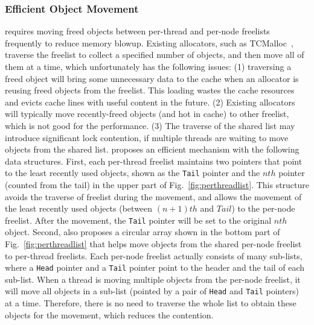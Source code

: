 \subsubsection{Efficient Object Movement} 
\label{sec:movement}
\NM{} requires moving freed objects between per-thread and per-node freelists frequently to reduce memory blowup. 
Existing allocators, such as TCMalloc~\cite{tcmalloc}, traverse the freelist to collect a specified number of objects, and then move all of them at a time, which unfortunately has the following issues: (1) traversing a freed object will bring some unnecessary data to the cache when an allocator is reusing freed objects from the freelist. This loading wastes the cache resources and evicts cache lines with useful content in the future. 
(2) Existing allocators will typically move recently-freed objects (and hot in cache) to other freelist, which is not good for the performance. (3) The traverse of the shared list may introduce significant lock contention, if multiple threads are waiting to move objects from the shared list. 
\NM{} proposes an efficient mechanism with the following data structures. First, each per-thread freelist maintains two pointers that point to the least recently used objects, shown as the \texttt{Tail} pointer and the $nth$ pointer (counted from the tail) in the upper part of  Fig.~\ref{fig:perthreadlist}. 
This structure avoids the traverse of freelist during the movement, and allows the movement of the least recently used objects (between $(n+1)th$ and $Tail$) to the per-node freelist. After the movement, the \texttt{Tail} pointer will be set to the original $nth$ object. 
Second, \NM{} also proposes a circular array shown in the bottom part of Fig.~\ref{fig:perthreadlist} that helps move objects from the shared per-node  freelist to per-thread freelists. 
Each per-node freelist actually consists of many sub-lists, where a \texttt{Head} pointer and a \texttt{Tail} pointer point to the header and the tail of each sub-list. When a thread is moving multiple objects from the per-node freelist, it will move all objects in a sub-list (pointed by a pair of \texttt{Head} and \texttt{Tail} pointers) at a time. Therefore, there is no need to traverse the whole list to obtain these objects for the movement, which reduces the contention. 


